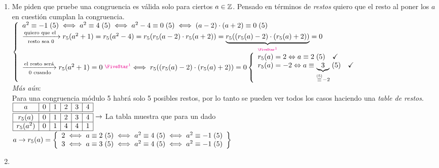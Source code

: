 \separadorCorto

\begin{enumerate}[label=\roman*)]
	\item Me piden que pruebe una congruencia es válida solo para ciertos $a \en \enteros$. Pensado en términos de \textit{restos}
	      quiero que el resto al poner los $a$ en cuestión cumplan la congruencia.\\
	      $
		      \llave{l}{
			      \congruencia{a^2}{-1}{5} \sisolosi
			      \congruencia{a^2}{4}{5}  \sisolosi
			      \congruencia{a^2 - 4}{0}{5} \sisolosi
			      \congruencia{(a-2)\cdot (a+2)}{0}{5}\\
			      \flecha{quiero que el }[resto sea 0]
			      r_5(a^2 + 1) =
			      r_5(a^2 - 4) =
			      r_5(r_5(a-2) \cdot r_5(a+2)) =
			      \ub{r_5(( r_5(a) - 2) \cdot (r_5(a) + 2) )}{\llamada{1}{}} = 0\\
			      \flecha{el resto será}[ 0 cuando] r_5(a^2 + 1) = 0 \llamada{1}\sisolosi
			      r_5(( r_5(a) - 2) \cdot (r_5(a) + 2) ) = 0
			      \llave{l}{
				      r_5(a) = 2 \Leftrightarrow  \congruencia{a}{2}{5} \Tilde\\
				      r_5(a) = -2 \Leftrightarrow  \congruencia{a}{\ub{3}{\stackrel{(5)}\congruente -2}}{5} \Tilde\\
			      }
		      }$\\
	      \textit{Más aún}:\\
	      Para una congruencia módulo 5 habrá solo 5 posibles restos, por lo tanto se pueden ver todos los casos
	      haciendo una \textit{table de restos}.\\
	      $
		      \begin{array}{|c|c|c|c|c|c|}
			      \hline
			      a        & 0 & 1 & 2 & 3 & 4 \\ \hline\hline
			      r_5(a)   & 0 & 1 & 2 & 3 & 4 \\ \hline
			      r_5(a^2) & 0 & 1 & 4 & 4 & 1 \\ \hline
		      \end{array}
		      \to   $ La tabla muestra que para un dado $a\\ \to
		      r_5(a) =
		      \llaves{l}{
			      2 \sisolosi \congruencia{a}{2}{5} \sisolosi \congruencia{a^2}{4}{5} \sisolosi \congruencia{a^2}{-1}{5} \\
			      3 \sisolosi \congruencia{a}{3}{5} \sisolosi \congruencia{a^2}{4}{5} \sisolosi \congruencia{a^2}{-1}{5} \\
		      }$

	\item \hacer


\end{enumerate}

